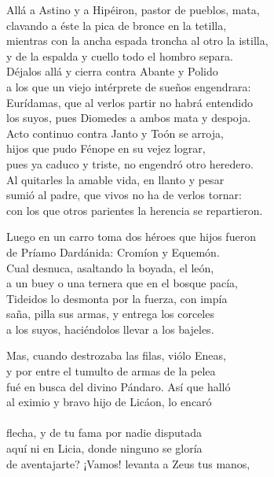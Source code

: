 Allá a Astino y a Hipéiron, pastor de pueblos, mata,\\
clavando a éste la pica de bronce en la tetilla,\\
mientras con la ancha espada troncha al otro la istilla,\\
y de la espalda y cuello todo el hombro separa.\\
Déjalos allá y cierra contra Abante y Polido\\
a los que un viejo intérprete de sueños engendrara:\\
Eurídamas, que al verlos partir no habrá entendido\\
los suyos, pues Diomedes a ambos mata y despoja.\\
Acto continuo contra Janto y Toón se arroja,\\
hijos que pudo Fénope en su vejez lograr,\\
pues ya caduco y triste, no engendró otro heredero.\\
Al quitarles la amable vida, en llanto y pesar\\
sumió al padre, que vivos no ha de verlos tornar:\\
con los que otros parientes la herencia se repartieron.\par
Luego en un carro toma dos héroes que hijos fueron\\
de Príamo Dardánida: Cromíon y Equemón.\\
Cual desnuca, asaltando la boyada, el león,\\
a un buey o una ternera que en el bosque pacía,\\
Tideidos lo desmonta por la fuerza, con impía\\
saña, pilla sus armas, y entrega los corceles\\
a los suyos, haciéndolos llevar a los bajeles.\par
Mas, cuando destrozaba las filas, viólo Eneas,\\
y por entre el tumulto de armas de la pelea\\
fué en busca del divino Pándaro. Así que halló\\
al eximio y bravo hijo de Licáon, lo encaró\\
\\
flecha, y de tu fama por nadie disputada\\
aquí ni en Licia, donde ninguno se gloría\\
de aventajarte? ¡Vamos! levanta a Zeus tus manos,\\
